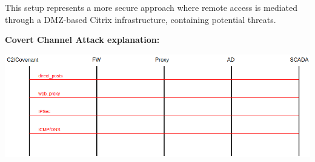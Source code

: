 This setup represents a more secure approach where remote access is mediated through a DMZ-based Citrix infrastructure, containing potential threats.

\textbf{Covert Channel Attack explanation:}
\begin{center}
    \includegraphics[scale=0.4]{resources/02-cover-channel-attack.png}
\end{center}
